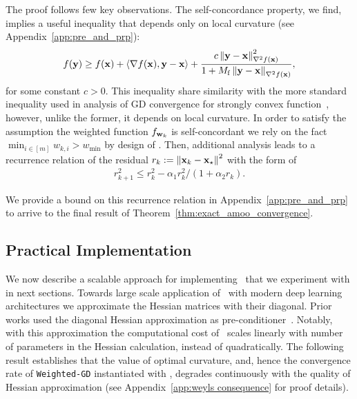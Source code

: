 The proof follows few key observations. The self-concordance property, we find, implies a useful inequality that depends only on local curvature (see Appendix~\ref{app:pre_and_prp}): 
\begin{align}
    f({\mathbf{y}}) \geq f({\mathbf{x}}) + \langle \nabla f({\mathbf{x}}), {\mathbf{y}}  - {\mathbf{x}} \rangle +  \frac{c\left\Vert{\mathbf{y}}-{\mathbf{x}}\right\Vert^2_{\nabla^2 f({\mathbf{x}})}}{1+M_{\mathrm{f}}\left\Vert{\mathbf{y}}-{\mathbf{x}}\right\Vert_{\nabla^2 f({\mathbf{x}})}},
    \label{eq:main paper self concordance}
\end{align}
for some constant $c>0$. This inequality share similarity with the more standard inequality used in analysis of GD convergence for strongly convex function~\cite{boyd2004convex}, however, unlike the former, it depends on local curvature. In order to satisfy the assumption the weighted function $f_{{\mathbf{w}}_k}$ is self-concordant we rely on the fact $\min_{i\in [m]} w_{k,i} > w_{\min}$ by design of \CAMOO. Then, additional analysis leads to a recurrence relation of the residual $r_k:=\left\Vert{\mathbf{x}}_k-{\mathbf{x}}_\star\right\Vert^2$ with the form of
\begin{align}
   r_{k+1}^2\leq r_k^2-\alpha_1 r_k^2/(1+\alpha_2 r_k).  \label{eq:main paper recursion}
\end{align}

We provide a bound on this recurrence relation in Appendix~\ref{app:pre_and_prp} to arrive to the final result of Theorem~\ref{thm:exact_amoo_convergence}. 


\subsection{Practical Implementation}\label{sec:prac_imp}

We now describe a scalable approach for implementing \CAMOO\ that we experiment with in next sections. Towards large scale application of \CAMOO\ with modern deep learning architectures we approximate the Hessian matrices with their diagonal.  Prior works used the diagonal Hessian approximation as pre-conditioner~\cite{chapelle2011improved,schaul2013no,yao2021adahessian,liu2023sophia,achituve2024bayesian}. Notably, with this approximation the computational cost of \CAMOO\ scales linearly with number of parameters in the Hessian calculation, instead of quadratically. The following result establishes that the value of optimal curvature, and, hence the convergence rate of \texttt{Weighted-GD} instantiated with \CAMOO, degrades continuously with the quality of Hessian approximation (see Appendix~\ref{app:weyls consequence} for proof details).

